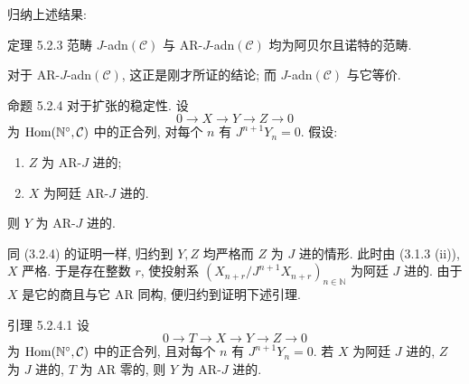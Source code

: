 归纳上述结果:

\begin{statement}{定理 5.2.3}
范畴 \(J\)-adn\((\mathcal C)\) 与 AR-\(J\)-adn\((\mathcal C)\) 均为阿贝尔且诺特的范畴.
\end{statement}

对于 AR-\(J\)-adn\((\mathcal C)\), 这正是刚才所证的结论; 而 \(J\)-adn\((\mathcal C)\) 与它等价.

\begin{statement}{命题 5.2.4}
对于扩张的稳定性. 设
\[
0\longrightarrow X\longrightarrow Y\longrightarrow Z\longrightarrow0
\]
为 \(\operatorname{Hom}(\mathbb N^\circ,\mathcal C)\) 中的正合列, 对每个 \(n\) 有 \(J^{n+1}Y_n=0\). 假设:
\begin{enumerate}[label=\textup{(\roman*)}]
\item \(Z\) 为 AR-\(J\) 进的;
\item \(X\) 为阿廷 AR-\(J\) 进的.
\end{enumerate}
则 \(Y\) 为 AR-\(J\) 进的.
\end{statement}

\begin{prooftext}
同 (3.2.4) 的证明一样, 归约到 \(Y,Z\) 均严格而 \(Z\) 为 \(J\) 进的情形. 此时由 (3.1.3 (ii)), \(X\) 严格. 于是存在整数 \(r\), 使投射系 \((X_{n+r}/J^{n+1}X_{n+r})_{n\in\mathbb N}\) 为阿廷 \(J\) 进的. 由于 \(X\) 是它的商且与它 AR 同构, 便归约到证明下述引理.
\end{prooftext}

\begin{statement}{引理 5.2.4.1}
设
\[
0\longrightarrow T\longrightarrow X\longrightarrow Y\longrightarrow Z\longrightarrow0
\]
为 \(\operatorname{Hom}(\mathbb N^\circ,\mathcal C)\) 中的正合列, 且对每个 \(n\) 有 \(J^{n+1}Y_n=0\). 若 \(X\) 为阿廷 \(J\) 进的, \(Z\) 为 \(J\) 进的, \(T\) 为 AR 零的, 则 \(Y\) 为 AR-\(J\) 进的.
\end{statement}

